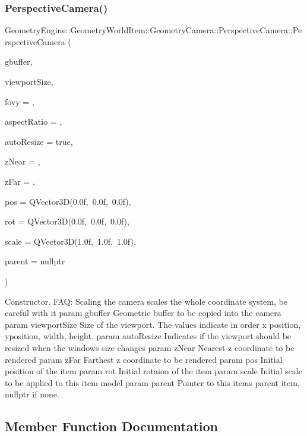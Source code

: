 \subsubsection{\texorpdfstring{PerspectiveCamera()}{PerspectiveCamera()}}
{\footnotesize\ttfamily Geometry\+Engine\+::\+Geometry\+World\+Item\+::\+Geometry\+Camera\+::\+Perspective\+Camera\+::\+Perspective\+Camera (\begin{DoxyParamCaption}\item[{const \mbox{\hyperlink{class_geometry_engine_1_1_geometry_buffer_1_1_g_buffer}{Geometry\+Buffer\+::\+G\+Buffer}} \&}]{gbuffer,  }\item[{const Q\+Vector4D \&}]{viewport\+Size,  }\item[{G\+Ldouble}]{fovy = {},  }\item[{G\+Ldouble}]{aspect\+Ratio = {},  }\item[{bool}]{auto\+Resize = {\ttfamily true},  }\item[{G\+Ldouble}]{z\+Near = {},  }\item[{G\+Ldouble}]{z\+Far = {},  }\item[{const Q\+Vector3D \&}]{pos = {\ttfamily QVector3D(0.0f,~0.0f,~0.0f)},  }\item[{const Q\+Vector3D \&}]{rot = {\ttfamily QVector3D(0.0f,~0.0f,~0.0f)},  }\item[{const Q\+Vector3D \&}]{scale = {\ttfamily QVector3D(1.0f,~1.0f,~1.0f)},  }\item[{\mbox{\hyperlink{class_geometry_engine_1_1_geometry_world_item_1_1_world_item}{World\+Item}} $\ast$}]{parent = {\ttfamily nullptr} }\end{DoxyParamCaption})}

Constructor. F\+AQ\+: Scaling the camera scales the whole coordinate system, be careful with it param gbuffer Geometric buffer to be copied into the camera param viewport\+Size Size of the viewport. The values indicate in order x position, yposition, width, height. param auto\+Resize Indicates if the viewport should be resized when the window\textquotesingle{}s size changes param z\+Near Nearest z coordinate to be rendered param z\+Far Farthest z coordinate to be rendered param pos Initial position of the item param rot Initial rotaion of the item param scale Initial scale to be applied to this item model param parent Pointer to this items parent item, nullptr if none. 

\subsection{Member Function Documentation}
\mbox{\label{class_geometry_engine_1_1_geometry_world_item_1_1_geometry_camera_1_1_perspective_camera_aae0b0f9a3cb2d11e946365129e75eb04}} 
